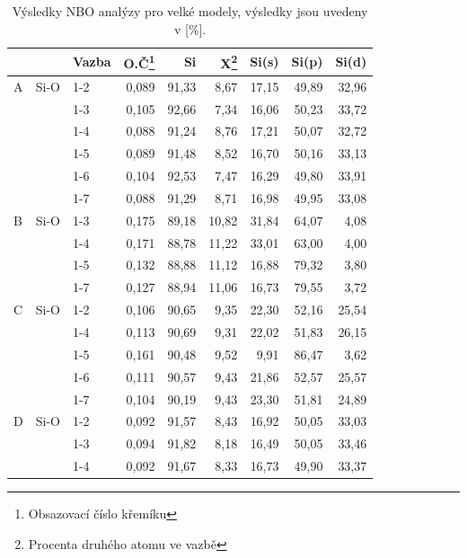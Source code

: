 \documentclass[
  digital, %
  table,   %
  lof,     %
  lot,     %
  oneside,
]{fithesis3}
\begin{document}
\begin{table}
\caption{Výsledky NBO analýzy pro velké modely, výsledky jsou uvedeny v [\%].}
\begin{minipage}{\textwidth}
\begin{center}
\begin{tabular}{|l|l|l|r|r|r|r|r|r|}
\hline
 \label{nbo_large}&  & Vazba & O.Č\footnote{Obsazovací číslo křemíku} & Si & X\footnote{Procenta druhého atomu ve  vazbě} & Si(s) & Si(p) &Si(d) \\ \hline
A & Si-O & 1-2  & 0,089 & 91,33   & 8,67   & 17,15   & 49,89   & 32,96   \\ \hline
 &  & 1-3  & 0,105 & 92,66   & 7,34   & 16,06   & 50,23   & 33,72   \\ \hline
 &  & 1-4  & 0,088 & 91,24   & 8,76   & 17,21   & 50,07   & 32,72   \\ \hline
 &  & 1-5  & 0,089 & 91,48   & 8,52   & 16,70   & 50,16   & 33,13   \\ \hline
 &  & 1-6 & 0,104 & 92,53   & 7,47   & 16,29   & 49,80   & 33,91   \\ \hline
 &  & 1-7 & 0,088 & 91,29   & 8,71   & 16,98   & 49,95   & 33,08   \\ \hline
B & Si-O & 1-3  & 0,175 & 89,18   & 10,82   & 31,84   & 64,07   & 4,08   \\ \hline
 &  & 1-4  & 0,171 & 88,78   & 11,22   & 33,01   & 63,00   & 4,00   \\ \hline
 &  & 1-5  & 0,132 & 88,88   & 11,12   & 16,88   & 79,32   & 3,80   \\ \hline
 &  & 1-7 & 0,127 & 88,94   & 11,06   & 16,73   & 79,55   & 3,72   \\ \hline
C & Si-O & 1-2  & 0,106 & 90,65   & 9,35   & 22,30   & 52,16   & 25,54   \\ \hline
 &  & 1-4  & 0,113 & 90,69   & 9,31   & 22,02   & 51,83   & 26,15   \\ \hline
 &  & 1-5  & 0,161 & 90,48   & 9,52   & 9,91   & 86,47   & 3,62   \\ \hline
 &  & 1-6 & 0,111 & 90,57   & 9,43   & 21,86   & 52,57   & 25,57   \\ \hline
 &  & 1-7 & 0,104 & 90,19   & 9,43   & 23,30   & 51,81   & 24,89   \\ \hline
D & Si-O & 1-2  & 0,092 & 91,57   & 8,43   & 16,92   & 50,05   & 33,03   \\ \hline
 &  & 1-3  & 0,094 & 91,82   & 8,18   & 16,49   & 50,05   & 33,46   \\ \hline
 &  & 1-4  & 0,092 & 91,67   & 8,33   & 16,73   & 49,90   & 33,37   \\ \hline

\end{tabular}
\end{center}
\end{minipage}
\end{table}
\end{document}

